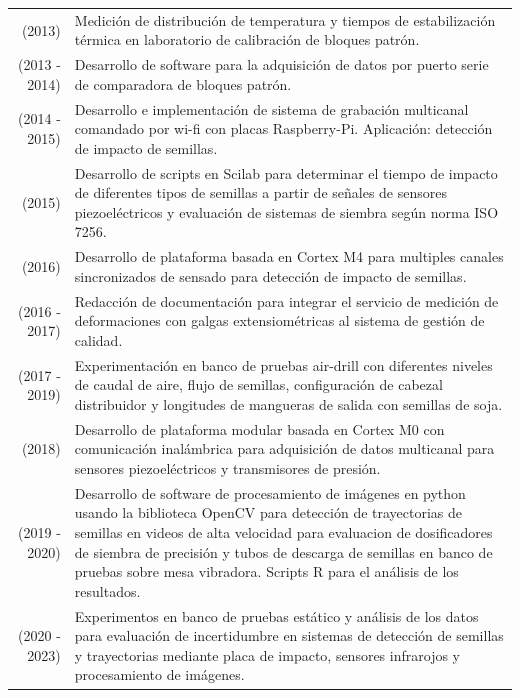 \documentclass[a4paper,10pt, sans]{article}
\begin{document}
\begin{table}[h!]
\begin{tabularx}{\textwidth}{r X}
        (2013) & Medición de distribución de temperatura y tiempos de estabilización térmica en laboratorio de calibración de bloques patrón. \\ [1ex]
        (2013 - 2014) & Desarrollo de software para la adquisición de datos por puerto serie de comparadora de bloques patrón. \\ [1ex]
        (2014 - 2015) & Desarrollo e implementación de sistema de grabación multicanal comandado por wi-fi con placas Raspberry-Pi. Aplicación: detección de impacto de semillas. \\ [1ex]
        (2015) & Desarrollo de scripts en Scilab para determinar el tiempo de impacto de diferentes tipos de semillas a partir de señales de sensores piezoeléctricos y evaluación de sistemas de siembra según norma ISO 7256. \\ [1ex]
        (2016) & Desarrollo de plataforma basada en Cortex M4 para multiples canales sincronizados de sensado para detección de impacto de semillas. \\ [1ex]
        (2016 - 2017) & Redacción de documentación para integrar el servicio de medición de deformaciones con galgas extensiométricas al sistema de gestión de calidad. \\ [1ex]
        (2017 - 2019) & Experimentación en banco de pruebas air-drill con diferentes niveles de caudal de aire, flujo de semillas, configuración de cabezal distribuidor y longitudes de mangueras de salida con semillas de soja. \\ [1ex]
        (2018) & Desarrollo de plataforma modular basada en Cortex M0 con comunicación inalámbrica para adquisición de datos multicanal para sensores piezoeléctricos y transmisores de presión. \\ [1ex]
        (2019 - 2020) & Desarrollo de software de procesamiento de imágenes en python usando la biblioteca OpenCV para detección de trayectorias de semillas en videos de alta velocidad para evaluacion de dosificadores de siembra de precisión y tubos de descarga de semillas en banco de pruebas sobre mesa vibradora. Scripts R para el análisis de los resultados. \\ [1ex]
        (2020 - 2023) & Experimentos en banco de pruebas estático y análisis de los datos para evaluación de incertidumbre en sistemas de detección de semillas y trayectorias mediante placa de impacto, sensores infrarojos y procesamiento de imágenes. \\ [1ex]
       
  \end{tabularx}
  \end{table}
  
\end{document}
